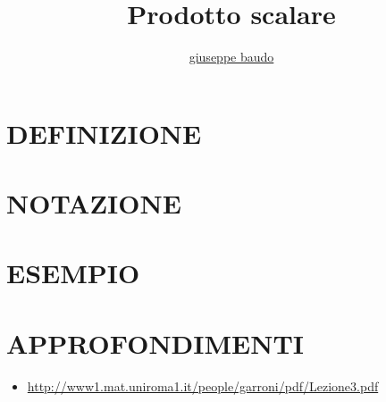 \documentclass[a4paper,10pt]{article}
\title{Prodotto scalare}
\author{\href{http://www.baudo.hol.es}{giuseppe baudo}}
\begin{document}
\maketitle

\section{DEFINIZIONE}

\section{NOTAZIONE}

\section{ESEMPIO}

\section{APPROFONDIMENTI}
\begin{itemize}
 \item \href{http://www1.mat.uniroma1.it/people/garroni/pdf/Lezione3.pdf}{http://www1.mat.uniroma1.it/people/garroni/pdf/Lezione3.pdf}
\end{itemize}
\end{document}
